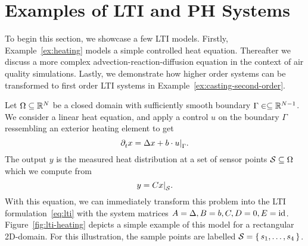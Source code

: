 \section{Examples of \texorpdfstring{\ac{LTI}}{LTI} and \texorpdfstring{\ac{PH}}{PH} Systems}

To begin this section, we showcase a few \ac{LTI} models.
Firstly, Example~\ref{ex:heating} models a simple controlled heat equation.
Thereafter we discuss a more complex advection-reaction-diffusion equation in the context of air quality simulations.
Lastly, we demonstrate how higher order systems can be transformed to first order \ac{LTI} systems in Example~\ref{ex:casting-second-order}.

\begin{example}\label{ex:heating}
    Let $\Omega \subseteq \mathbb{R}^N$ be a closed domain with sufficiently smooth boundary $\Gamma \in \subseteq \mathbb{R}^{N - 1}$.
    We consider a linear heat equation, and apply a control $u$ on the boundary $\Gamma$ ressembling an exterior heating element to get
    \begin{equation*}
        \pd[t]{} x = \lapl{x} + b \cdot \res{u}{\Gamma}.
    \end{equation*}
    The output $y$ is the measured heat distribution at a set of sensor points $\mathcal{S} \subseteq \Omega$ which we compute from
    \begin{equation*}
        y = C \res{x}{\mcl{S}}.
    \end{equation*}
    With this equation, we can immediately transform this problem into the \ac{LTI} formulation~\eqref{eq:lti} with the system matrices $A = \mathop{}\!\Delta{}, B = b, C, D = 0, E = \text{id}_{}$.
    Figure~\ref{fig:lti-heating} depicts a simple example of this model for a rectangular 2D-domain.
    For this illustration, the sample points are labelled $\mathcal{S} = \left\{\,s_1, \dots, s_4\,\right\}$.

    \begin{figure}[h]
        \centering
\end{figure}
\end{example}
